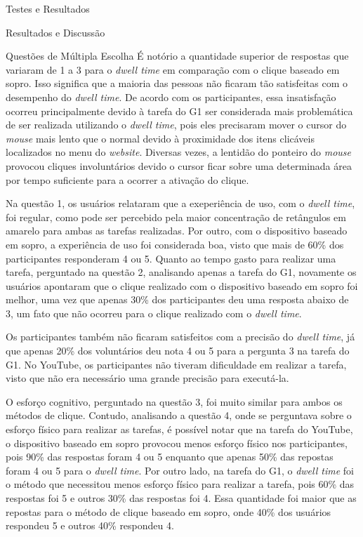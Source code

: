 \begin{chapter}{Testes e Resultados}
\begin{section}{Resultados e Discussão}
\begin{subsection}{Questões de Múltipla Escolha}
É notório a quantidade superior de respostas que variaram de 1 a 3 para o
\textit{dwell time} em comparação com o clique baseado em sopro. Isso significa
que a maioria das pessoas não ficaram tão satisfeitas com o desempenho do
\textit{dwell time}. De acordo com os participantes, essa insatisfação ocorreu
principalmente devido à tarefa do G1 ser considerada mais problemática de ser
realizada utilizando o \textit{dwell time}, pois eles precisaram mover o
cursor do \textit{mouse} mais lento que o normal devido à proximidade dos itens
clicáveis localizados no menu do \textit{website}. Diversas vezes, a lentidão do
ponteiro do \textit{mouse} provocou cliques involuntários devido o cursor ficar
sobre uma determinada área por tempo suficiente para a ocorrer a ativação do
clique.

Na questão 1, os usuários relataram que a exeperiência de uso, com o
\textit{dwell time}, foi regular, como pode ser percebido pela maior
concentração de retângulos em amarelo para ambas as tarefas realizadas. Por
outro, com o dispositivo baseado em sopro, a experiência de uso foi considerada
boa, visto que mais de 60\% dos participantes responderam 4 ou 5.  Quanto ao
tempo gasto para realizar uma tarefa, perguntado na questão 2, analisando apenas
a tarefa do G1, novamente os usuários apontaram que o clique realizado com o
dispositivo baseado em sopro foi melhor, uma vez que apenas 30\% dos
participantes deu uma resposta abaixo de 3, um fato que não ocorreu para o
clique realizado com o \textit{dwell time}.

Os participantes também não ficaram satisfeitos com a precisão do \textit{dwell
time}, já que apenas 20\% dos voluntários deu nota 4 ou 5 para a pergunta 3 na
tarefa do G1. No YouTube, os participantes não tiveram dificuldade em realizar a
tarefa, visto que não era necessário uma grande precisão para executá-la. 

O esforço cognitivo, perguntado na questão 3, foi muito similar para ambos os
métodos de clique. Contudo, analisando a questão 4, onde se perguntava sobre o
esforço físico para realizar as tarefas, é possível notar que na tarefa do
YouTube, o dispositivo baseado em sopro provocou menos esforço físico nos
participantes, pois 90\% das respostas foram 4 ou 5 enquanto que apenas 50\%
das repostas foram 4 ou 5 para o \textit{dwell time}. Por outro lado, na tarefa
do G1, o \textit{dwell time} foi o método que necessitou menos esforço físico
para realizar a tarefa, pois 60\% das respostas foi 5 e outros 30\% das
respostas foi 4. Essa quantidade foi maior que as repostas para o método de
clique baseado em sopro, onde 40\% dos usuários respondeu 5 e outros 40\%
respondeu 4.


\end{subsection}
\end{section}
\end{chapter}
